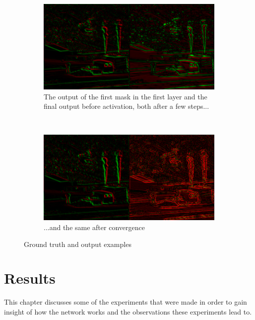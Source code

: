 \documentclass[12pt]{report}
\begin{document}
\begin{figure}
	\centering
	\begin{subfigure}[b]{\linewidth}
		\centering
		\includegraphics[width=0.8\linewidth]{images/layer1.png}
		\caption{The output of the first mask in the first layer and the final output before activation, both after a few steps...}
	\end{subfigure}
	\\
	\begin{subfigure}[b]{\linewidth}
		\centering
		\includegraphics[width=0.8\linewidth]{images/layer2.png}
		\caption{...and the same after convergence}
	\end{subfigure}
	\caption{Ground truth and output examples}
\end{figure}


\chapter{Results}
This chapter discusses some of the experiments that were made in order to gain insight of how the network works and the observations these experiments lead to.
\end{document}
